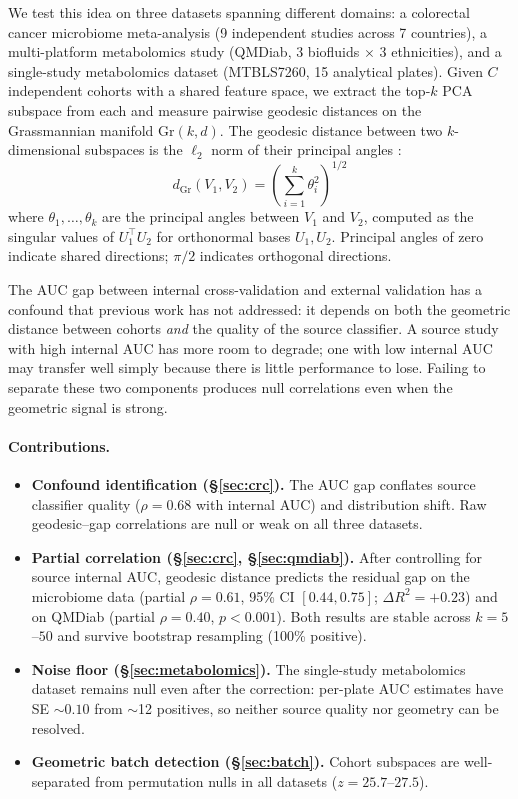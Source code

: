 \documentclass{article}
\begin{document}
We test this idea on three datasets spanning different domains: a colorectal cancer microbiome meta-analysis (9 independent studies across 7 countries), a multi-platform metabolomics study (QMDiab, 3 biofluids $\times$ 3 ethnicities), and a single-study metabolomics dataset (MTBLS7260, 15 analytical plates). Given $C$ independent cohorts with a shared feature space, we extract the top-$k$ PCA subspace from each and measure pairwise geodesic distances on the Grassmannian manifold $\mathrm{Gr}(k, d)$. The geodesic distance between two $k$-dimensional subspaces is the $\ell_2$ norm of their principal angles \citep{bjorck1973numerical, ye2016schubert}:
\begin{equation}
d_{\mathrm{Gr}}(V_1, V_2) = \left(\sum_{i=1}^{k} \theta_i^2\right)^{1/2}
\end{equation}
where $\theta_1, \ldots, \theta_k$ are the principal angles between $V_1$ and $V_2$, computed as the singular values of $U_1^\top U_2$ for orthonormal bases $U_1, U_2$. Principal angles of zero indicate shared directions; $\pi/2$ indicates orthogonal directions.

The AUC gap between internal cross-validation and external validation has a confound that previous work has not addressed: it depends on both the geometric distance between cohorts \emph{and} the quality of the source classifier. A source study with high internal AUC has more room to degrade; one with low internal AUC may transfer well simply because there is little performance to lose. Failing to separate these two components produces null correlations even when the geometric signal is strong.

\paragraph{Contributions.}
\begin{itemize}
\item \textbf{Confound identification (\S\ref{sec:crc}).} The AUC gap conflates source classifier quality ($\rho = 0.68$ with internal AUC) and distribution shift. Raw geodesic--gap correlations are null or weak on all three datasets.
\item \textbf{Partial correlation (\S\ref{sec:crc}, \S\ref{sec:qmdiab}).} After controlling for source internal AUC, geodesic distance predicts the residual gap on the microbiome data (partial $\rho = 0.61$, 95\% CI $[0.44, 0.75]$; $\Delta R^2 = +0.23$) and on QMDiab (partial $\rho = 0.40$, $p < 0.001$). Both results are stable across $k = 5$--$50$ and survive bootstrap resampling (100\% positive).
\item \textbf{Noise floor (\S\ref{sec:metabolomics}).} The single-study metabolomics dataset remains null even after the correction: per-plate AUC estimates have SE $\sim 0.10$ from $\sim$12 positives, so neither source quality nor geometry can be resolved.
\item \textbf{Geometric batch detection (\S\ref{sec:batch}).} Cohort subspaces are well-separated from permutation nulls in all datasets ($z = 25.7$--$27.5$).
\end{itemize}
\end{document}
